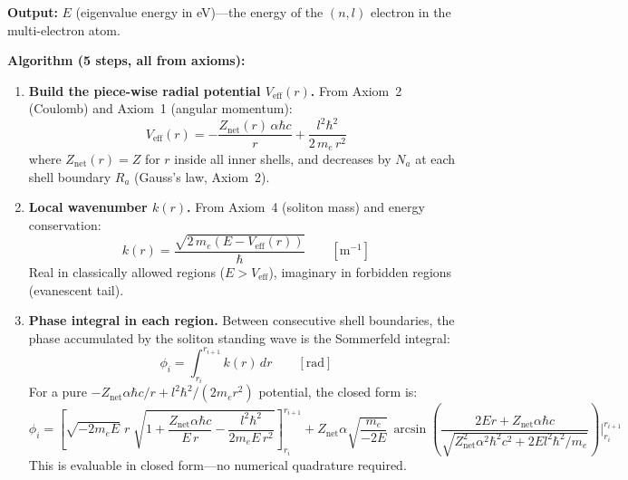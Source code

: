 \noindent\textbf{Output:}
$E$ (eigenvalue energy in eV)---the energy of the
$(n, l)$ electron in the multi-electron atom.

\noindent\textbf{Algorithm (5 steps, all from axioms):}

\begin{enumerate}
\item \textbf{Build the piece-wise radial potential
$V_{\text{eff}}(r)$.}
From Axiom~2 (Coulomb) and Axiom~1 (angular momentum):\vspace{-4pt}
\begin{equation}
    V_{\text{eff}}(r) = -\frac{Z_{\text{net}}(r)\,
    \alpha\hbar c}{r}
    + \frac{l^2\hbar^2}{2\,m_e\,r^2}
    \label{eq:V_eff_radial}
\end{equation}
where $Z_{\text{net}}(r) = Z$ for $r$ inside all
inner shells, and decreases by $N_a$ at each
shell boundary $R_a$ (Gauss's law, Axiom~2).

\item \textbf{Local wavenumber $k(r)$.}
From Axiom~4 (soliton mass) and energy conservation:\vspace{-4pt}
\begin{equation}
    k(r) = \frac{\sqrt{2\,m_e(E - V_{\text{eff}}(r))}}
    {\hbar}
    \qquad [\text{m}^{-1}]
    \label{eq:k_local}
\end{equation}
Real in classically allowed regions ($E > V_{\text{eff}}$),
imaginary in forbidden regions (evanescent tail).

\item \textbf{Phase integral in each region.}
Between consecutive shell boundaries, the phase
accumulated by the soliton standing wave is the
Sommerfeld integral:\vspace{-4pt}
\begin{equation}
    \phi_i = \int_{r_{i}}^{r_{i+1}} k(r)\,dr
    \qquad [\text{rad}]
    \label{eq:phase_integral}
\end{equation}
For a pure $-Z_{\text{net}}\alpha\hbar c / r
+ l^2\hbar^2/(2m_e r^2)$ potential, the closed form
is:\vspace{-4pt}
\begin{equation}
    \phi_i = \left[
    \sqrt{-2m_e E}\;r
    \;\sqrt{1 + \frac{Z_{\text{net}}\alpha\hbar c}{E\,r}
    - \frac{l^2\hbar^2}{2m_e E\,r^2}}
    \right]_{r_i}^{r_{i+1}}
    + Z_{\text{net}}\alpha
    \sqrt{\frac{m_e}{-2E}}\,
    \arcsin\!\left(\frac{2Er + Z_{\text{net}}
    \alpha\hbar c}{\sqrt{Z_{\text{net}}^2\alpha^2\hbar^2 c^2
    + 2El^2\hbar^2/m_e}}\right)
    \Bigg|_{r_i}^{r_{i+1}}
\end{equation}
This is evaluable in closed form---no numerical
quadrature required.


\end{enumerate}
